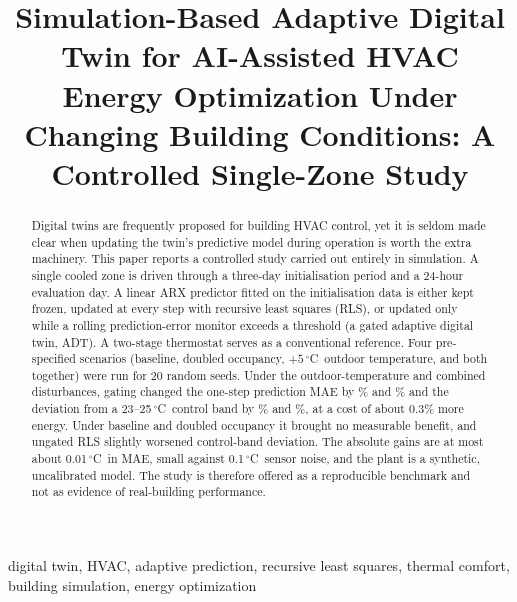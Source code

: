 \documentclass[conference]{IEEEtran}
\newcommand{\degC}{\ensuremath{^{\circ}}C}
\begin{document}
\title{Simulation-Based Adaptive Digital Twin for AI-Assisted HVAC Energy Optimization Under Changing Building Conditions: A Controlled Single-Zone Study}

\author{
\and
{}
}

\maketitle

\begin{abstract}
Digital twins are frequently proposed for building HVAC control, yet it is seldom made clear when updating the twin's predictive model during operation is worth the extra machinery. This paper reports a controlled study carried out entirely in simulation. A single cooled zone is driven through a three-day initialisation period and a 24-hour evaluation day. A linear ARX predictor fitted on the initialisation data is either kept frozen, updated at every step with recursive least squares (RLS), or updated only while a rolling prediction-error monitor exceeds a threshold (a gated adaptive digital twin, ADT). A two-stage thermostat serves as a conventional reference. Four pre-specified scenarios (baseline, doubled occupancy, $+5$\,\degC\ outdoor temperature, and both together) were run for 20 random seeds. Under the outdoor-temperature and combined disturbances, gating changed the one-step prediction MAE by \PctMaeGtFxOut\% and \PctMaeGtFxComb\% and the deviation from a 23--25\,\degC\ control band by \PctTightGtFxOut\% and \PctTightGtFxComb\%, at a cost of about 0.3\% more energy. Under baseline and doubled occupancy it brought no measurable benefit, and ungated RLS slightly worsened control-band deviation. The absolute gains are at most about 0.01\,\degC\ in MAE, small against 0.1\,\degC\ sensor noise, and the plant is a synthetic, uncalibrated model. The study is therefore offered as a reproducible benchmark and not as evidence of real-building performance.
\end{abstract}

\begin{IEEEkeywords}
digital twin, HVAC, adaptive prediction, recursive least squares, thermal comfort, building simulation, energy optimization
\end{IEEEkeywords}
\end{document}
